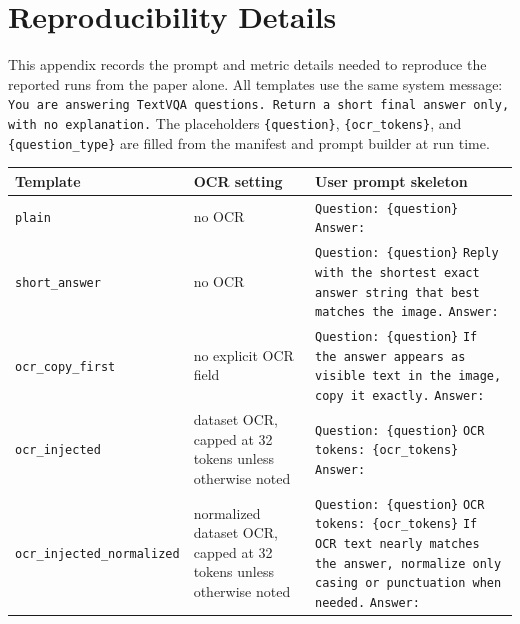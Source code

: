 \section{Reproducibility Details}
\label{app:reproducibility}

This appendix records the prompt and metric details needed to reproduce the reported runs from the paper alone. All templates use the same system message: \texttt{You are answering TextVQA questions. Return a short final answer only, with no explanation.} The placeholders \texttt{\{question\}}, \texttt{\{ocr\_tokens\}}, and \texttt{\{question\_type\}} are filled from the manifest and prompt builder at run time.

\begin{center}
    \centering
    \scriptsize
    \setlength{\tabcolsep}{3pt}
    \begin{tabular}{>{\raggedright\arraybackslash}p{}>{\raggedright\arraybackslash}p{}>{\raggedright\arraybackslash}p{}}
        \toprule
        Template & OCR setting & User prompt skeleton \\
        \midrule
        \texttt{plain} & no OCR & \texttt{Question: \{question\}} \newline \texttt{Answer:} \\
        \texttt{short\_answer} & no OCR & \texttt{Question: \{question\}} \newline \texttt{Reply with the shortest exact answer string that best matches the image.} \newline \texttt{Answer:} \\
        \texttt{ocr\_copy\_first} & no explicit OCR field & \texttt{Question: \{question\}} \newline \texttt{If the answer appears as visible text in the image, copy it exactly.} \newline \texttt{Answer:} \\
        \texttt{ocr\_injected} & dataset OCR, capped at 32 tokens unless otherwise noted & \texttt{Question: \{question\}} \newline \texttt{OCR tokens: \{ocr\_tokens\}} \newline \texttt{Answer:} \\
        \texttt{ocr\_injected\_}\newline\texttt{normalized} & normalized dataset OCR, capped at 32 tokens unless otherwise noted & \texttt{Question: \{question\}} \newline \texttt{OCR tokens: \{ocr\_tokens\}} \newline \texttt{If OCR text nearly matches the answer, normalize only casing or punctuation when needed.} \newline \texttt{Answer:} \\

\end{tabular}
\end{center}
